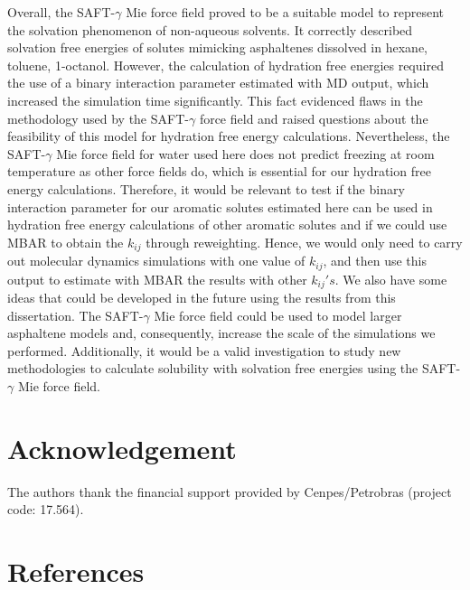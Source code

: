 \documentclass[final,12p,times,twocolumn]{elsarticle}
\begin{document}
	Overall, the SAFT-$\gamma$ Mie force field proved to be a suitable model to represent the solvation phenomenon of non-aqueous solvents. It correctly described solvation free energies of solutes mimicking asphaltenes dissolved in hexane, toluene, 1-octanol. However, the calculation of hydration free energies required the use of a binary interaction parameter estimated with MD output, which increased the simulation time significantly. This fact evidenced flaws in the methodology used by the SAFT-$\gamma$ force field and raised questions about the feasibility of this model for hydration free energy calculations. Nevertheless, the SAFT-$\gamma$ Mie force field for water used here does not predict freezing at room temperature as other force fields do, which is essential for our hydration free energy calculations. Therefore, it would be relevant to test if the binary interaction parameter for our aromatic solutes estimated here can be used in hydration free energy calculations of other aromatic solutes and if we could use MBAR to obtain the $k_{ij}$ through reweighting. Hence, we would only need to carry out molecular dynamics simulations with one value of $k_{ij}$, and then use this output to estimate with MBAR the results with other $k_{ij} 's $. We also have some ideas that could be developed in the future using the results from this dissertation. The SAFT-$\gamma$ Mie force field could be used to model larger asphaltene models and, consequently, increase the scale of the simulations we performed. Additionally, it would be a valid investigation to study new methodologies to calculate solubility with solvation free energies using the SAFT-$\gamma$ Mie force field.
	
	
	
	
	\section{Acknowledgement}
	
	The authors thank the financial support provided by Cenpes/Petrobras (project code: 17.564). 
	
	\section*{References}
	
	
	
	\appendix
\end{document}
